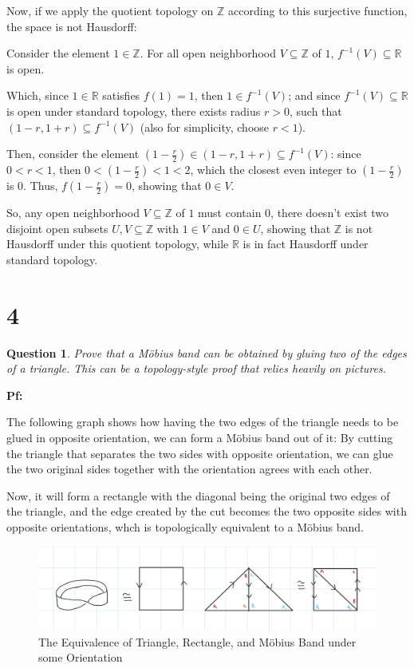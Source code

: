 \documentclass{article}
\newtheorem{question}{Question}
\begin{document}
\hfill

Now, if we apply the quotient topology on $\mathbb{Z}$ according to this surjective function, the space is not Hausdorff:

Consider the element $1\in\mathbb{Z}$. For all open neighborhood $V\subseteq \mathbb{Z}$ of $1$, $f^{-1}(V)\subseteq \mathbb{R}$ is open.

Which, since $1\in\mathbb{R}$ satisfies $f(1)=1$, then $1\in f^{-1}(V)$; and since $f^{-1}(V)\subseteq \mathbb{R}$ is open under standard topology,
there exists radius $r>0$, such that $(1-r,1+r)\subseteq f^{-1}(V)$ (also for simplicity, choose $r<1$).

Then, consider the element $(1-\frac{r}{2})\in (1-r,1+r)\subseteq f^{-1}(V)$: since $0<r<1$, then $0<(1-\frac{r}{2})<1<2$, which the closest even integer to $(1-\frac{r}{2})$ is $0$.
Thus, $f(1-\frac{r}{2})=0$, showing that $0\in V$.

So, any open neighborhood $V\subseteq \mathbb{Z}$ of $1$ must contain $0$, there doesn't exist two disjoint open subsets $U,V\subseteq \mathbb{Z}$
with $1\in V$ and $0\in U$, showing that $\mathbb{Z}$ is not Hausdorff under this quotient topology, while $\mathbb{R}$ is in fact Hausdorff under standard topology.

\hfill

\hfill

\section*{4}
\begin{myBox}[]{}
    \begin{question}
        Prove that a Möbius band can be obtained by gluing two of the edges of a
        triangle. This can be a topology-style proof that relies heavily on pictures.
    \end{question}
\end{myBox}

\textbf{Pf:}

The following graph shows how having the two edges of the triangle needs to be glued in opposite orientation, 
we can form a Möbius band out of it: By cutting the triangle that separates the two sides with opposite orientation,
we can glue the two original sides together with the orientation agrees with each other.

Now, it will form a rectangle with the diagonal being the original two edges of the triangle, 
and the edge created by the cut becomes the two opposite sides with opposite orientations, whch is topologically equivalent
to a Möbius band.

\begin{figure}[h!]
    \begin{center}
        \includegraphics*[width=160mm]{mobius.jpg}
        \caption{The Equivalence of Triangle, Rectangle, and Möbius Band under some Orientation}
    \end{center}
\end{figure}
\end{document}
